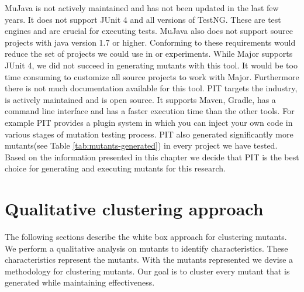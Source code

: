 \documentclass[conference,draftclsnofoot,onecolumn]{IEEEtran}
\begin{document}
MuJava is not actively maintained and has not been updated in the last few years.
It does not support JUnit 4 and all versions of TestNG\cite{mujava}.
These are test engines and are crucial for executing tests.
MuJava also does not support source projects with java version 1.7 or higher\cite{mujava}.
Conforming to these requirements would reduce the set of projects we could use in or experiments.
\newline
While Major supports JUnit 4,
we did not succeed in generating mutants with this tool\cite{thesis}.
It would be too time consuming to customize all source projects to work with Major.
Furthermore there is not much documentation available for this tool.
\newline
PIT targets the industry, is actively maintained and is open source\cite{Kintis2016AnalysingStudy}.
It supports Maven, Gradle, has a command line interface and has a faster execution time than the other tools.
For example PIT provides a plugin system in which you can inject your own code in various stages of mutation testing process\cite{pit}.
PIT also generated significantly more mutants(see Table \ref{tab:mutants-generated}) in every project we have tested\cite{thesis}.
Based on the information presented in this chapter we decide that PIT is the best choice for generating and executing mutants for this research.

\section{Qualitative clustering approach}
\label{ch:reserach_question1}
The following sections describe the white box approach for clustering mutants.
We perform a qualitative analysis on mutants to identify characteristics. 
These characteristics represent the mutants.
With the mutants represented we devise a methodology for clustering mutants.
Our goal is to cluster every mutant that is generated while maintaining effectiveness.
\end{document}
